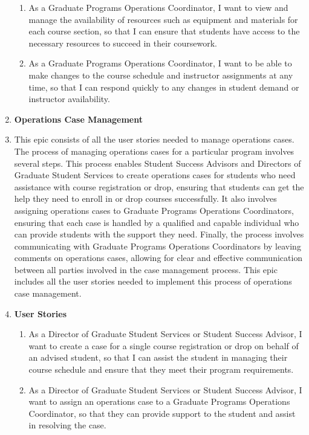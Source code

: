 \documentclass[12pt]{article}
\begin{document}
\begin{appendices}
\begin{enumerate}[label=(\roman*)]
\begin{enumerate}
            \item As a Graduate Programs Operations Coordinator, I want to view and manage the availability of resources such as equipment and materials for each course section, so that I can ensure that students have access to the necessary resources to succeed in their coursework.
            \item As a Graduate Programs Operations Coordinator, I want to be able to make changes to the course schedule and instructor assignments at any time, so that I can respond quickly to any changes in student demand or instructor availability.            
        \end{enumerate}


        \item \textbf{Operations Case Management}
        \item[] This epic consists of all the user stories needed to manage operations cases. The process of managing operations cases for a particular program involves several steps. This process enables Student Success Advisors and Directors of Graduate Student Services to create operations cases for students who need assistance with course registration or drop, ensuring that students can get the help they need to enroll in or drop courses successfully. It also involves assigning operations cases to Graduate Programs Operations Coordinators, ensuring that each case is handled by a qualified and capable individual who can provide students with the support they need. Finally, the process involves communicating with Graduate Programs Operations Coordinators by leaving comments on operations cases, allowing for clear and effective communication between all parties involved in the case management process. This epic includes all the user stories needed to implement this process of operations case management.
        \item[] \textbf{User Stories}
        \begin{enumerate}
            \item As a Director of Graduate Student Services or Student Success Advisor, I want to create a case for a single course registration or drop on behalf of an advised student, so that I can assist the student in managing their course schedule and ensure that they meet their program requirements.
            \item As a Director of Graduate Student Services or Student Success Advisor, I want to assign an operations case to a Graduate Programs Operations Coordinator, so that they can provide support to the student and assist in resolving the case.

\end{enumerate}
\end{enumerate}
\end{appendices}
\end{document}
